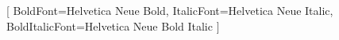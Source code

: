 \usepackage{fontspec}
\usepackage[dvipsnames]{xcolor}

\setmainfont{Helvetica Neue}[
  BoldFont=Helvetica Neue Bold,
  ItalicFont=Helvetica Neue Italic,
  BoldItalicFont=Helvetica Neue Bold Italic
]

\usepackage{unicode-math}

\newcommand{\emoji}[1]{#1}